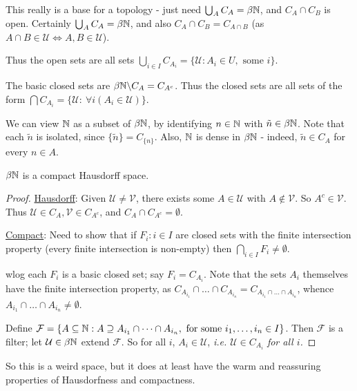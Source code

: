 \documentclass[10pt]{article}
\newcommand{\F}{\mathcal{F}}
\newcommand{\U}{\mathcal{U}}
\newcommand{\V}{\mathcal{V}}
\begin{document}
This really is a base for a topology - just need $\bigcup_{A}C_A = \beta\mathbb{N}$, and $C_A\cap C_B$ is open. Certainly $\bigcup_A C_A = \beta\mathbb{N}$, and also $C_A \cap C_B = C_{A\cap B}$ (as $A\cap B \in \U \iff A,B\in \U$).

Thus the open sets are all sets $\bigcup_{i\in I}C_{A_i} = \{\U : A_i \in U,\textrm{ some }i\}$.

The basic closed sets are $\beta\mathbb{N}\backslash C_A = C_{A^c}$. Thus the closed sets are all sets of the form $\bigcap C_{A_i} = \{\U:\ \forall i(A_i\in \U)\}$.

We can view $\mathbb{N}$ as a subset of $\beta\mathbb{N}$, by identifying $n\in \mathbb{N}$ with $\tilde{n} \in \beta\mathbb{N}$. Note that each $\tilde{n}$ is isolated, since $\{\tilde{n}\} = C_{\{n\}}$. Also, $\mathbb{N}$ is dense in $\beta\mathbb{N}$ - indeed, $\tilde{n} \in C_A$ for every $n \in A$.

\begin{theorem}
    $\beta\mathbb{N}$ is a compact Hausdorff space.
\end{theorem}
\begin{proof}
    \underline{Hausdorff}: Given $\U\ne \V$, there exists some $A \in \U$ with $A\not\in \V$. So $A^c \in \V$. Thus $\U \in C_A, \V \in C_{A^c}$, and $C_A\cap C_{A^c} = \emptyset$.

    \underline{Compact}: Need to show that if $F_i:i\in I$ are closed sets with the finite intersection property (every finite intersection is non-empty) then $\bigcap_{i\in I}F_i\ne\emptyset$.

    wlog each $F_i$ is a basic closed set; say $F_i = C_{A_i}$. Note that the sets $A_i$ themselves have the finite intersection property, as $C_{A_{i_1}}\cap\dots\cap C_{A_{i_n}} = C_{A_{i_1}\cap\dots\cap A_{i_n}}$, whence $A_{i_1}\cap\dots\cap A_{i_n}\ne \emptyset$.

    Define $\F = \{A\subset\N : A\supseteq A_{i_1}\cap\dots\cap A_{i_n},\textrm{ for some }i_1,\dots,i_n\in I\}$. Then $\F$ is a filter; let $\U \in \beta\N$ extend $\F$. So for all $i$, $A_i\in \U$, \it{i.e.} $\U \in C_{A_i}$ for all $i$.
\end{proof}

So this is a weird space, but it does at least have the warm and reassuring properties of Hausdorfness and compactness.
\end{document}
